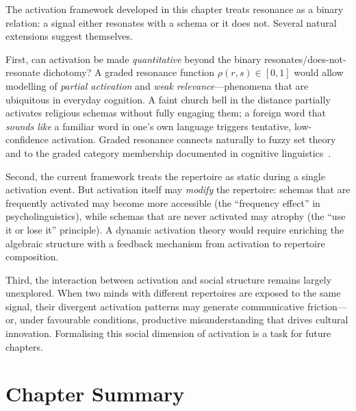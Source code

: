 \begin{remark}
\label{rem:open-questions}
The activation framework developed in this chapter treats resonance as
a binary relation: a signal either resonates with a schema or it does
not.  Several natural extensions suggest themselves.

First, can activation be made \emph{quantitative} beyond the binary
resonates/does-not-resonate dichotomy?  A graded resonance
function $\rho(r, s) \in [0, 1]$ would allow modelling of
\emph{partial activation} and \emph{weak relevance}---phenomena that
are ubiquitous in everyday cognition.  A faint church bell in the
distance partially activates religious schemas without fully engaging
them; a foreign word that \emph{sounds like} a familiar word in one's
own language triggers tentative, low-confidence activation.  Graded
resonance connects naturally to fuzzy set theory~\cite{zadeh1965}
and to the graded category membership documented in cognitive
linguistics~\cite{rosch1975}.

Second, the current framework treats the repertoire as static during
a single activation event.  But activation itself may \emph{modify}
the repertoire: schemas that are frequently activated may become more
accessible (the ``frequency effect'' in psycholinguistics), while
schemas that are never activated may atrophy (the ``use it or lose it''
principle).  A dynamic activation theory would require enriching the
algebraic structure with a feedback mechanism from activation to
repertoire composition.

Third, the interaction between activation and social structure remains
largely unexplored.  When two minds with different repertoires are
exposed to the same signal, their divergent activation patterns may
generate communicative friction---or, under favourable conditions,
productive misunderstanding that drives cultural innovation.
Formalising this social dimension of activation is a task for future
chapters.
\end{remark}

\section*{Chapter Summary}

